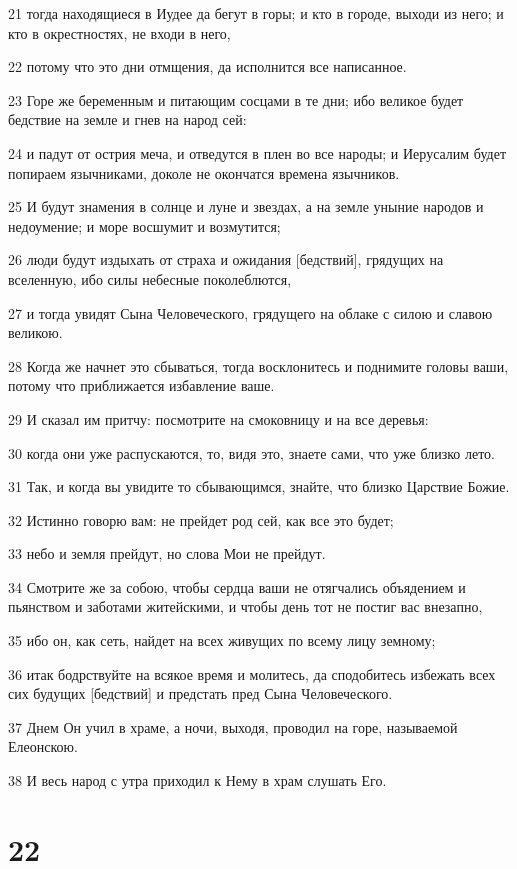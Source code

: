 \par 21 тогда находящиеся в Иудее да бегут в горы; и кто в городе, выходи из него; и кто в окрестностях, не входи в него,
\par 22 потому что это дни отмщения, да исполнится все написанное.
\par 23 Горе же беременным и питающим сосцами в те дни; ибо великое будет бедствие на земле и гнев на народ сей:
\par 24 и падут от острия меча, и отведутся в плен во все народы; и Иерусалим будет попираем язычниками, доколе не окончатся времена язычников.
\par 25 И будут знамения в солнце и луне и звездах, а на земле уныние народов и недоумение; и море восшумит и возмутится;
\par 26 люди будут издыхать от страха и ожидания [бедствий], грядущих на вселенную, ибо силы небесные поколеблются,
\par 27 и тогда увидят Сына Человеческого, грядущего на облаке с силою и славою великою.
\par 28 Когда же начнет это сбываться, тогда восклонитесь и поднимите головы ваши, потому что приближается избавление ваше.
\par 29 И сказал им притчу: посмотрите на смоковницу и на все деревья:
\par 30 когда они уже распускаются, то, видя это, знаете сами, что уже близко лето.
\par 31 Так, и когда вы увидите то сбывающимся, знайте, что близко Царствие Божие.
\par 32 Истинно говорю вам: не прейдет род сей, как все это будет;
\par 33 небо и земля прейдут, но слова Мои не прейдут.
\par 34 Смотрите же за собою, чтобы сердца ваши не отягчались объядением и пьянством и заботами житейскими, и чтобы день тот не постиг вас внезапно,
\par 35 ибо он, как сеть, найдет на всех живущих по всему лицу земному;
\par 36 итак бодрствуйте на всякое время и молитесь, да сподобитесь избежать всех сих будущих [бедствий] и предстать пред Сына Человеческого.
\par 37 Днем Он учил в храме, а ночи, выходя, проводил на горе, называемой Елеонскою.
\par 38 И весь народ с утра приходил к Нему в храм слушать Его.

\chapter{22}

